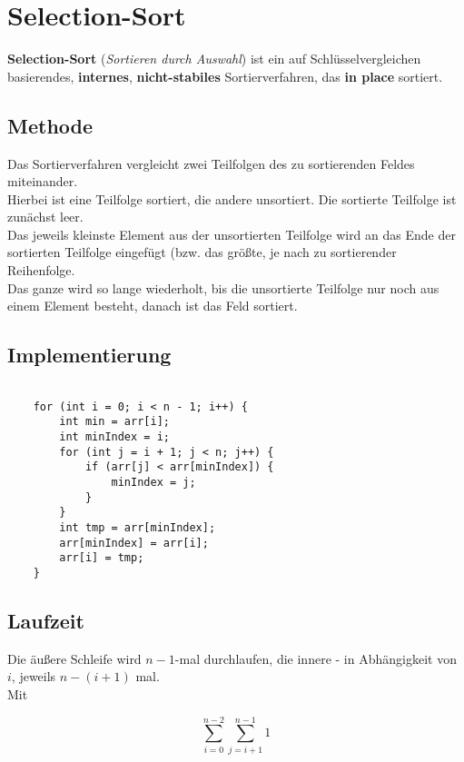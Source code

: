 \section{Selection-Sort}

\textbf{Selection-Sort} (\textit{Sortieren durch Auswahl}) ist ein auf Schlüsselvergleichen basierendes, \textbf{internes}, \textbf{nicht-stabiles} Sortierverfahren, das \textbf{in place} sortiert.

\subsection{Methode}
Das Sortierverfahren vergleicht zwei Teilfolgen des zu sortierenden Feldes miteinander.\\
Hierbei ist eine Teilfolge sortiert, die andere unsortiert.
Die sortierte Teilfolge ist zunächst leer.\\
Das jeweils kleinste Element aus der unsortierten Teilfolge wird an das Ende der sortierten Teilfolge eingefügt (bzw. das größte, je nach zu sortierender Reihenfolge.\\
Das ganze wird so lange wiederholt, bis die unsortierte Teilfolge nur noch aus einem Element besteht, danach ist das Feld sortiert.


\subsection{Implementierung}

\begin{verbatim}

    for (int i = 0; i < n - 1; i++) {
        int min = arr[i];
        int minIndex = i;
        for (int j = i + 1; j < n; j++) {
            if (arr[j] < arr[minIndex]) {
                minIndex = j;
            }
        }
        int tmp = arr[minIndex];
        arr[minIndex] = arr[i];
        arr[i] = tmp;
    }

\end{verbatim}


\subsection{Laufzeit}
Die äußere Schleife wird $n - 1$-mal durchlaufen, die innere - in Abhängigkeit von $i$, jeweils $n - (i + 1)$ mal.\\
Mit

\begin{equation}
    \sum_{i=0}^{n-2} \sum_{j = i + 1}^{n - 1} 1
\end{equation}

